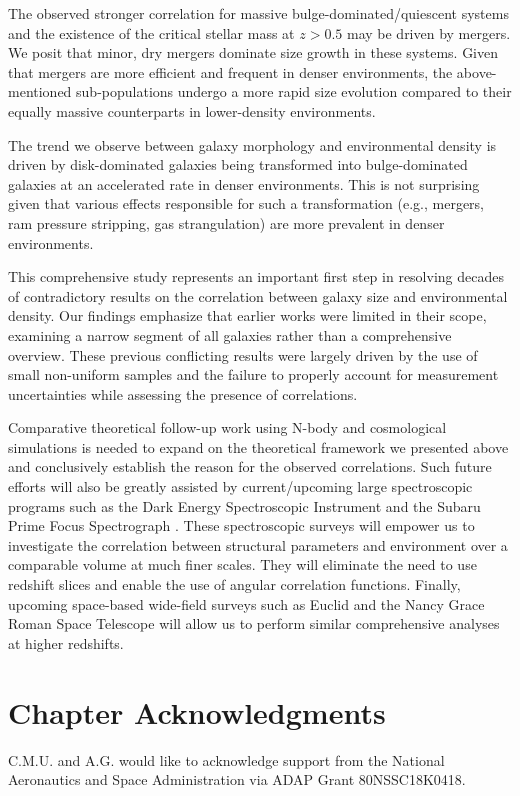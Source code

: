 The observed stronger correlation for massive bulge-dominated/quiescent systems and the existence of the critical stellar mass at $z > 0.5$ may be driven by mergers. We posit that minor, dry mergers dominate size growth in these systems. Given that mergers are more efficient and frequent in denser environments, the above-mentioned sub-populations undergo a more rapid size evolution compared to their equally massive counterparts in lower-density environments.

The trend we observe between galaxy morphology and environmental density is driven by disk-dominated galaxies being transformed into bulge-dominated galaxies at an accelerated rate in denser environments. This is not surprising given that various effects responsible for such a transformation (e.g., mergers, ram pressure stripping, gas strangulation) are more prevalent in denser environments. 

This comprehensive study represents an important first step in resolving decades of contradictory results on the correlation between galaxy size and environmental density. Our findings emphasize that earlier works were limited in their scope, examining a narrow segment of all galaxies rather than a comprehensive overview. These previous conflicting results were largely driven by the use of small non-uniform samples and the failure to properly account for measurement uncertainties while assessing the presence of correlations. 

Comparative theoretical follow-up work using N-body and cosmological simulations is needed to expand on the theoretical framework we presented above and conclusively establish the reason for the observed correlations. Such future efforts will also be greatly assisted by current/upcoming large spectroscopic programs such as the Dark Energy Spectroscopic Instrument \citep[DESI;][]{desi} and the Subaru Prime Focus Spectrograph \citep[PFS;][]{pfs}. These spectroscopic surveys will empower us to investigate the correlation between structural parameters and environment over a comparable volume at much finer scales. They will eliminate the need to use redshift slices and enable the use of angular correlation functions. Finally, upcoming space-based wide-field surveys such as Euclid \citep{euclid} and the Nancy Grace Roman Space Telescope \citep[NGRST;][]{ngrst} will allow us to perform similar comprehensive analyses at higher redshifts. 


\section*{Chapter Acknowledgments}
C.M.U. and A.G. would like to acknowledge support from the National Aeronautics and Space Administration via ADAP Grant 80NSSC18K0418. 

